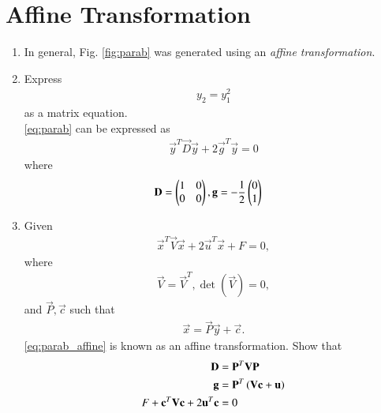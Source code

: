 \documentclass[journal,12pt,twocolumn]{IEEEtran}
\renewcommand\thesection{\arabic{section}}
\begin{document}
\section{Affine Transformation}
\begin{enumerate}[label=\thesection.\arabic*
,ref=\thesection.\theenumi]
\item In general, Fig. \ref{fig:parab} was generated using an {\em affine transformation}.

\item Express 
\begin{align}
y_2 = y_1^2
\label{eq:parab}
\end{align}
as a matrix equation.
\\
\solution  \eqref{eq:parab} can be expressed as
\begin{align}
\vec{y}^T\vec{D}\vec{y}+2\vec{g}^T\vec{y} = 0
\label{eq:parab_mat}
\end{align}
%
where 
\begin{align}
\mathbf{D} = \begin{pmatrix}1 & 0 \\ 0 & 0\end{pmatrix} 
,
\mathbf{g} &= -\frac{1}{2}\begin{pmatrix}0 \\ 1\end{pmatrix}
\label{eq:parab_coeffs}
\end{align}
%
\item Given 
\begin{align}
\vec{x}^T\vec{V}\vec{x}+2\vec{u}^T\vec{x}+ F = 0,
\label{eq:parab_gen}
\end{align}
where 
\begin{align}
\vec{V}=\vec{V}^T, \det(\vec{V}) = 0,
\label{eq:parab_vcond}
\end{align}
%
and $\vec{P}, \vec{c}$ such that
\begin{align}
\vec{x} = \vec{P}\vec{y}+\vec{c}.
\label{eq:parab_affine}
\end{align}
\eqref{eq:parab_affine} is known as an affine transformation.
Show that
\begin{align}
\begin{split}
\mathbf{D} &= \mathbf{P}^T\mathbf{V}\mathbf{P}
\\
\mathbf{g} &= \mathbf{P}^T\left(\mathbf{V}\mathbf{c}+\mathbf{u}\right)
\\
F+ \mathbf{c}^T\mathbf{V}\mathbf{c} + 2\mathbf{u}^T\mathbf{c}&= 0
\end{split}
\label{eq:parab_parmas}
\end{align}


\end{enumerate}
\end{document}

